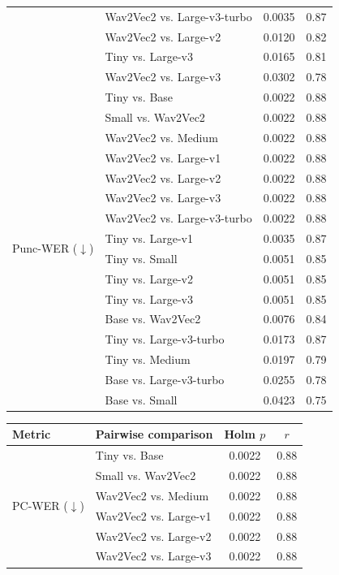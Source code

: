 \begin{table}[!t]
\begin{minipage}[t]{0.49\textwidth}
\begin{tabular}{@{}l l c c@{}}
 & Wav2Vec2 vs. Large-v3-turbo & 0.0035 & 0.87 \\
 & Wav2Vec2 vs. Large-v2 & 0.0120 & 0.82 \\
 & Tiny vs. Large-v3 & 0.0165 & 0.81 \\
 & Wav2Vec2 vs. Large-v3 & 0.0302 & 0.78 \\
\midrule
\multirow{16}{*}{Punc-WER ($\downarrow$)}
 & Tiny vs. Base & 0.0022 & 0.88 \\
 & Small vs. Wav2Vec2 & 0.0022 & 0.88 \\
 & Wav2Vec2 vs. Medium & 0.0022 & 0.88 \\
 & Wav2Vec2 vs. Large-v1 & 0.0022 & 0.88 \\
 & Wav2Vec2 vs. Large-v2 & 0.0022 & 0.88 \\
 & Wav2Vec2 vs. Large-v3 & 0.0022 & 0.88 \\
 & Wav2Vec2 vs. Large-v3-turbo & 0.0022 & 0.88 \\
 & Tiny vs. Large-v1 & 0.0035 & 0.87 \\
 & Tiny vs. Small & 0.0051 & 0.85 \\
 & Tiny vs. Large-v2 & 0.0051 & 0.85 \\
 & Tiny vs. Large-v3 & 0.0051 & 0.85 \\
 & Base vs. Wav2Vec2 & 0.0076 & 0.84 \\
 & Tiny vs. Large-v3-turbo & 0.0173 & 0.87 \\
 & Tiny vs. Medium & 0.0197 & 0.79 \\
 & Base vs. Large-v3-turbo & 0.0255 & 0.78 \\
 & Base vs. Small & 0.0423 & 0.75 \\
\bottomrule
\end{tabular}
\end{minipage}\hfill
\begin{minipage}[t]{0.49\textwidth}
\centering
\begin{tabular}{@{}l l c c@{}}
\toprule
\textbf{Metric} & \textbf{Pairwise comparison} & \textbf{Holm $p$} & \textbf{$r$} \\
\midrule
\multirow{15}{*}{PC-WER ($\downarrow$)}
 & Tiny vs. Base & 0.0022 & 0.88 \\
 & Small vs. Wav2Vec2 & 0.0022 & 0.88 \\
 & Wav2Vec2 vs. Medium & 0.0022 & 0.88 \\
 & Wav2Vec2 vs. Large-v1 & 0.0022 & 0.88 \\
 & Wav2Vec2 vs. Large-v2 & 0.0022 & 0.88 \\
 & Wav2Vec2 vs. Large-v3 & 0.0022 & 0.88 \\

\end{tabular}
\end{minipage}
\end{table}
